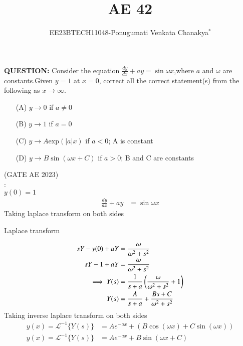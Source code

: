 \documentclass[journal,12pt,twocolumn]{IEEEtran}
\theoremstyle{remark}
\begin{document}
 
 \vspace{3cm}
 \title{\textbf{AE 42}}
 \author{EE23BTECH11048-Ponugumati Venkata Chanakya$^{*}$%
 }
 \maketitle
 \newpage
 \bigskip
 \renewcommand{\thefigure}{\theenumi}
 \renewcommand{\thetable}{\theenumi}
 \textbf{QUESTION:}
Consider the equation $\frac{dy}{dx}+ay=\sin{\omega x}$,where $a$ and $\omega$ are constants.Given $y=1$ at $x=0$, correct all the correct statement(s) from the following as $x\to \infty$.
\begin{enumerate}
  \item[(A)]  $y \to 0$ if $a \neq 0$ \\ 
  \item[(B)]  $y \to 1$ if $a = 0$\\
  \item[(C)]  $y \to A\text{exp}(|a|x)$ if $a < 0$; A is constant\\
  \item[(D)]  $y \to B \sin(\omega x+C)$ if $a>0$; B and C are constants\\
\end{enumerate}
 \hfill(GATE AE 2023)\\
\solution:\\
\fi
  $y(0)=1$
\begin{align}
 \frac{dy}{dx}+ay &= \sin{\omega x}
\end{align}
 Taking laplace transform on both sides 
  \begin{table}[!ht]
    \centering
        
    \caption{Laplace transform}
    \label{tab:Gate_AE.42 }
\end{table}
\begin{align}
    sY-y(0)+aY &= \frac{\omega}{\omega^2+s^2}\\
    sY-1+aY &= \frac{\omega}{\omega^2+s^2}\\
    \implies Y(s)&=\frac{1}{s+a} \left(\frac{\omega}{\omega^2+s^2}+1\right)\\
     Y(s)&=\frac{A}{s+a} +\frac{Bs+C}{\omega^2+s^2}
 \end{align}
 Taking inverse laplace transform on both sides 
 \begin{align}
      y(x) = \mathcal{L}^{-1}\{Y(s)\} &= A e^{-ax} + (B\cos(\omega x) + C\sin(\omega x))\\
       y(x) = \mathcal{L}^{-1}\{Y(s)\} &= A e^{-ax} + B\sin(\omega x+C)
 \end{align}
\end{document}
